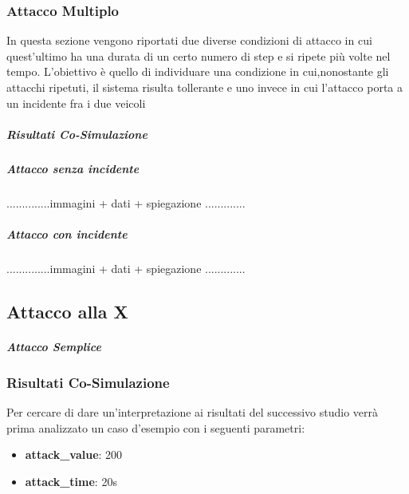 \subsubsection{Attacco Multiplo}
In questa sezione vengono riportati due diverse condizioni di attacco in cui quest'ultimo ha una durata di un certo numero di step e si ripete più volte nel tempo. L'obiettivo è quello di individuare una condizione in cui,nonostante gli attacchi ripetuti, il sistema risulta tollerante e uno invece in cui l'attacco porta a un incidente fra i due veicoli
\subparagraph{Risultati Co-Simulazione}
\subparagraph{Attacco senza incidente}
..............immagini + dati + spiegazione .............
\subparagraph{Attacco con incidente}
..............immagini + dati + spiegazione .............


\subsection{Attacco alla X}
\subparagraph{Attacco Semplice}
\subsubsection{Risultati Co-Simulazione}
Per cercare di dare un'interpretazione ai risultati del successivo studio verrà prima analizzato un caso d'esempio con i seguenti parametri:
\begin{itemize}
	\item \textbf{attack\_value}: 200
	\item \textbf{attack\_time}: 20s
\end{itemize}

